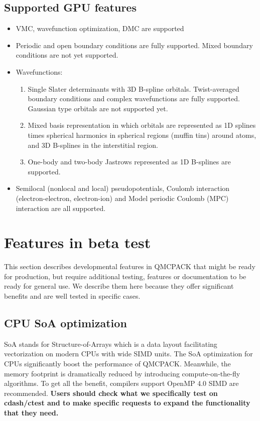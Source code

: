 \subsection{Supported GPU features}

\begin{itemize}

  \item VMC, wavefunction optimization, DMC are supported
  \item Periodic and open boundary conditions are fully supported. Mixed boundary conditions are not yet supported.
  \item Wavefunctions:
    \begin{enumerate}
        \item Single Slater determinants with 3D B-spline orbitals. Twist-averaged boundary conditions and complex wavefunctions are fully supported. Gaussian type orbitals are not supported yet.
        \item Mixed basis representation in which orbitals are represented as 1D splines times spherical harmonics in spherical regions (muffin tins) around atoms, and 3D B-splines in the interstitial region.
        \item One-body and two-body Jastrows represented as 1D B-splines are supported.
    \end{enumerate}
  \item Semilocal (nonlocal and local) pseudopotentials, Coulomb interaction (electron-electron, electron-ion) and Model periodic Coulomb (MPC) interaction are all supported.
\end{itemize}

\section{Features in beta test}
This section describes developmental features in QMCPACK that might be ready for production, but require additional testing, features or documentation to be ready for general use. We describe them here because they offer significant benefits and are well tested in specific cases.

\subsection{CPU SoA optimization}
SoA stands for Structure-of-Arrays which is a data layout facilitating vectorization on modern CPUs with wide SIMD units. The SoA optimization for CPUs significantly boost the performance of QMCPACK. Meanwhile, the memory footprint is dramatically reduced by introducing compute-on-the-fly algorithms. To get all the benefit, compilers support OpenMP 4.0 SIMD are recommended. \textbf{Users should check what we specifically test on cdash/ctest and to make specific requests to expand the functionality that they need.}

